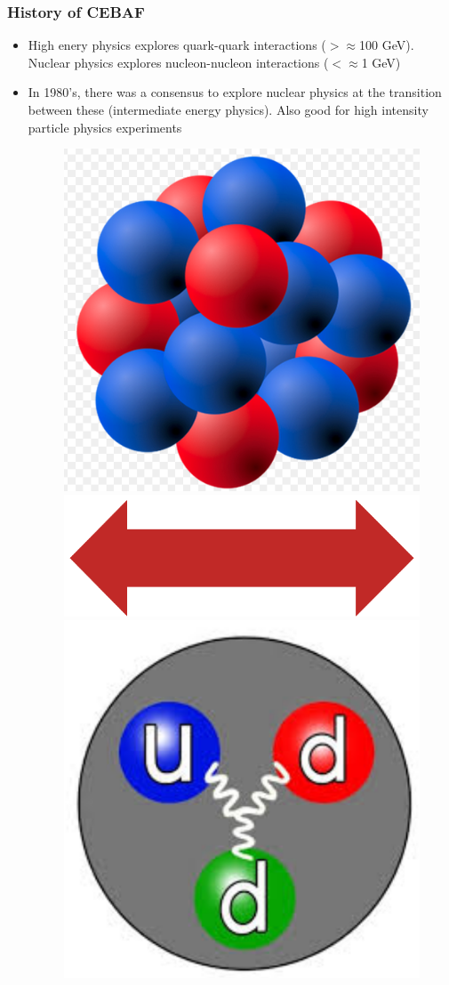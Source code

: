 \documentclass{beamer}
\begin{document}
\begin{frame}
\frametitle{History of CEBAF}
\begin{itemize}
\item High enery physics explores quark-quark interactions ($>\approx$100 GeV). Nuclear physics explores nucleon-nucleon interactions ($<\approx$1 GeV)
\item In 1980's, there was a consensus to explore nuclear physics at the transition between these (intermediate energy physics). Also good for high intensity particle physics experiments
\begin{figure}
\includegraphics[width=0.35\linewidth]{figs/nucleons.png}
\includegraphics[width=0.35\linewidth]{figs/arrow.png}
\includegraphics[width=0.35\linewidth]{figs/quarks.png}
\end{figure}
\end{itemize}

\end{frame}

\end{document}
